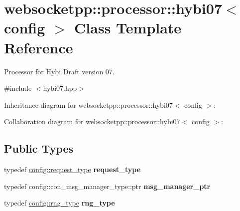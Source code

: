 \hypertarget{classwebsocketpp_1_1processor_1_1hybi07}{}\section{websocketpp\+:\+:processor\+:\+:hybi07$<$ config $>$ Class Template Reference}
\label{classwebsocketpp_1_1processor_1_1hybi07}


Processor for Hybi Draft version 07.  




{\ttfamily \#include $<$hybi07.\+hpp$>$}



Inheritance diagram for websocketpp\+:\+:processor\+:\+:hybi07$<$ config $>$\+:


Collaboration diagram for websocketpp\+:\+:processor\+:\+:hybi07$<$ config $>$\+:
\subsection*{Public Types}
\begin{DoxyCompactItemize}
\item 
\mbox{\label{classwebsocketpp_1_1processor_1_1hybi07_ae8e3aeed4b4d6d67c8af5dccf70d468d}} 
typedef \mbox{\hyperlink{classwebsocketpp_1_1http_1_1parser_1_1request}{config\+::request\+\_\+type}} {\bfseries request\+\_\+type}
\item 
\mbox{\label{classwebsocketpp_1_1processor_1_1hybi07_abfa0723364d644f3320141ade624fc8e}} 
typedef config\+::con\+\_\+msg\+\_\+manager\+\_\+type\+::ptr {\bfseries msg\+\_\+manager\+\_\+ptr}
\item 
\mbox{\label{classwebsocketpp_1_1processor_1_1hybi07_afb0db8323385a430df83372ce5b29bc2}} 
typedef \mbox{\hyperlink{classwebsocketpp_1_1random_1_1none_1_1int__generator}{config\+::rng\+\_\+type}} {\bfseries rng\+\_\+type}
\end{DoxyCompactItemize}
